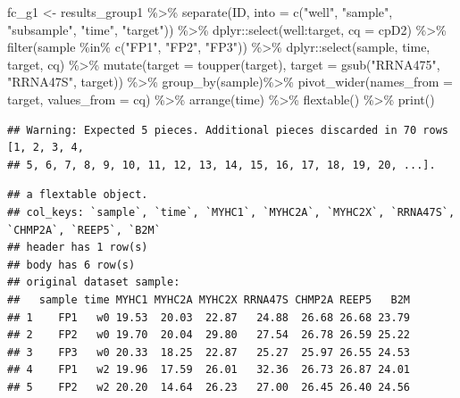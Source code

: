 \documentclass[
]{book}
\newenvironment{Shaded}{\begin{snugshade}}{\end{snugshade}}
\newcommand{\AttributeTok}[1]{\textcolor[rgb]{0.77,0.63,0.00}{#1}}
\newcommand{\FunctionTok}[1]{\textcolor[rgb]{0.00,0.00,0.00}{#1}}
\newcommand{\NormalTok}[1]{#1}
\newcommand{\OtherTok}[1]{\textcolor[rgb]{0.56,0.35,0.01}{#1}}
\newcommand{\SpecialCharTok}[1]{\textcolor[rgb]{0.00,0.00,0.00}{#1}}
\newcommand{\StringTok}[1]{\textcolor[rgb]{0.31,0.60,0.02}{#1}}
\begin{document}
\begin{Shaded}
\begin{Highlighting}[]
\NormalTok{fc\_g1 }\OtherTok{\textless{}{-}}\NormalTok{ results\_group1 }\SpecialCharTok{\%\textgreater{}\%}
  \FunctionTok{separate}\NormalTok{(ID, }\AttributeTok{into =} \FunctionTok{c}\NormalTok{(}\StringTok{"well"}\NormalTok{, }\StringTok{"sample"}\NormalTok{, }\StringTok{"subsample"}\NormalTok{, }\StringTok{"time"}\NormalTok{, }\StringTok{"target"}\NormalTok{)) }\SpecialCharTok{\%\textgreater{}\%}
\NormalTok{  dplyr}\SpecialCharTok{::}\FunctionTok{select}\NormalTok{(well}\SpecialCharTok{:}\NormalTok{target, }\AttributeTok{cq =}\NormalTok{ cpD2) }\SpecialCharTok{\%\textgreater{}\%}
  \FunctionTok{filter}\NormalTok{(sample }\SpecialCharTok{\%in\%} \FunctionTok{c}\NormalTok{(}\StringTok{"FP1"}\NormalTok{, }\StringTok{"FP2"}\NormalTok{, }\StringTok{"FP3"}\NormalTok{)) }\SpecialCharTok{\%\textgreater{}\%}
\NormalTok{  dplyr}\SpecialCharTok{::}\FunctionTok{select}\NormalTok{(sample, time, target, cq) }\SpecialCharTok{\%\textgreater{}\%}
  \FunctionTok{mutate}\NormalTok{(}\AttributeTok{target =} \FunctionTok{toupper}\NormalTok{(target), }
         \AttributeTok{target =} \FunctionTok{gsub}\NormalTok{(}\StringTok{"RRNA475"}\NormalTok{, }\StringTok{"RRNA47S"}\NormalTok{, target)) }\SpecialCharTok{\%\textgreater{}\%}
  \FunctionTok{group\_by}\NormalTok{(sample)}\SpecialCharTok{\%\textgreater{}\%}
  \FunctionTok{pivot\_wider}\NormalTok{(}\AttributeTok{names\_from =}\NormalTok{ target, }\AttributeTok{values\_from =}\NormalTok{ cq) }\SpecialCharTok{\%\textgreater{}\%}
  \FunctionTok{arrange}\NormalTok{(time) }\SpecialCharTok{\%\textgreater{}\%}
   \FunctionTok{flextable}\NormalTok{() }\SpecialCharTok{\%\textgreater{}\%}
  \FunctionTok{print}\NormalTok{()}
\end{Highlighting}
\end{Shaded}

\begin{verbatim}
## Warning: Expected 5 pieces. Additional pieces discarded in 70 rows [1, 2, 3, 4,
## 5, 6, 7, 8, 9, 10, 11, 12, 13, 14, 15, 16, 17, 18, 19, 20, ...].
\end{verbatim}

\begin{verbatim}
## a flextable object.
## col_keys: `sample`, `time`, `MYHC1`, `MYHC2A`, `MYHC2X`, `RRNA47S`, `CHMP2A`, `REEP5`, `B2M` 
## header has 1 row(s) 
## body has 6 row(s) 
## original dataset sample: 
##   sample time MYHC1 MYHC2A MYHC2X RRNA47S CHMP2A REEP5   B2M
## 1    FP1   w0 19.53  20.03  22.87   24.88  26.68 26.68 23.79
## 2    FP2   w0 19.70  20.04  29.80   27.54  26.78 26.59 25.22
## 3    FP3   w0 20.33  18.25  22.87   25.27  25.97 26.55 24.53
## 4    FP1   w2 19.96  17.59  26.01   32.36  26.73 26.87 24.01
## 5    FP2   w2 20.20  14.64  26.23   27.00  26.45 26.40 24.56
\end{verbatim}
\end{document}
